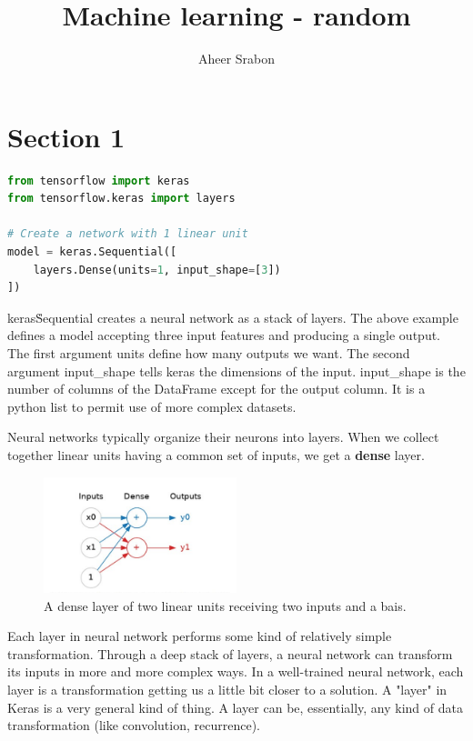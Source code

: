 

\title{Machine learning - random}
\author{Aheer Srabon}
\date{}


\maketitle

\section{Section 1}
\begin{lstlisting}[language=Python]
from tensorflow import keras
from tensorflow.keras import layers

# Create a network with 1 linear unit
model = keras.Sequential([
	layers.Dense(units=1, input_shape=[3])
])
\end{lstlisting}

\noindent keras\.Sequential creates a neural network as a stack
of layers. The above example defines a model accepting three input
features and producing a single output. The first argument units
define how many outputs we want. The second argument input\_shape
tells keras the dimensions of the input. input\_shape is the number
of columns of the DataFrame except for the output column. It is a
python list to permit use of more complex datasets.

\noindent Neural networks typically organize their neurons into layers.
When we collect together linear units having a common set of inputs, we
get a \textbf{dense} layer.

\begin{figure}[htp]
	\centering
	\includegraphics[width=0.5\textwidth]{../assets/machine_learning_random/denser_layer_with_two_inputs_and_a_bias.jpg}
	\caption{A dense layer of two linear units receiving two inputs and a bais.}
\end{figure}

\noindent Each layer in neural network performs some kind of relatively
simple transformation. Through a deep stack of layers, a neural network can
transform its inputs in more and more complex ways. In a well-trained
neural network, each layer is a transformation getting us a little bit
closer to a solution. A "layer" in Keras is a very general kind of thing.
A layer can be, essentially, any kind of data transformation (like
convolution, recurrence). 

